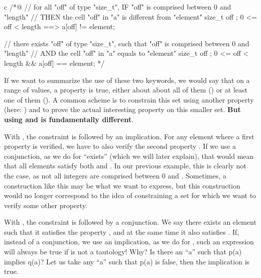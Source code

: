 \begin{CodeBlock}{c}
/*@
// for all "off" of type "size_t", IF "off" is comprised between 0 and "length"
//                                 THEN the cell "off" in "a" is different from "element"
\forall size_t off ; 0 <= off < length ==> a[off] != element;

// there exists "off" of type "size_t", such that "off" is comprised between 0 and "length"
//                                      AND the cell "off" in "a" equals to "element"
\exists size_t off ; 0 <= off < length && a[off] == element;
*/
\end{CodeBlock}


If we want to summarize the use of these two keywords, we would say that on a
range of values, a property is true, either about about all of them
() or at least one of them
(). A common scheme is to constrain this set using
another property (here: ) and to prove the
actual interesting property on this smaller set. \textbf{But using
 and  is
fundamentally different}.


With ,
the constraint  is followed by an implication.
For any element where a first property  is verified, we have
to also verify the second property . If we use a conjunction,
as we do for ``exists'' (which we will later explain), that would mean that
all elements satisfy both  and . In our previous
example, this is clearly not the case, as not all integers are comprised between
0 and . Sometimes, a construction like this may be what we want to express, but
this construction would no longer correspond to the idea of constraining a set for which
we want to verify some other property.


With , the
constraint  is followed by a conjunction. We say there exists
an element such that it satisfies the property , and at the same
time it also satisfies . If, instead of a conjunction, we use an implication, as we do
for , such an expression will always be true
if  is not a tautology! Why? Is there an ``a'' such that p(a) implies
q(a)? Let us take any ``a'' such that p(a) is false, then the implication is true.



